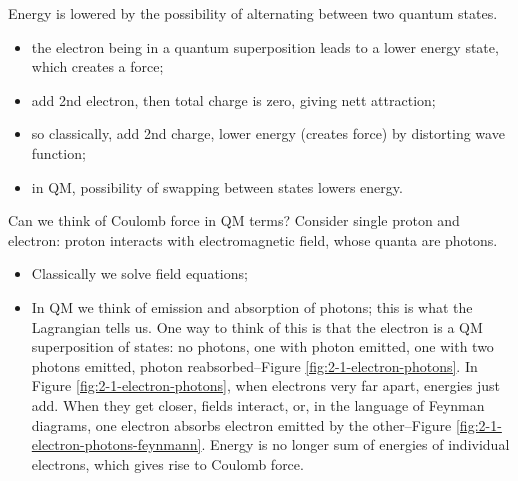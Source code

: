\documentclass[]{article}
\begin{document}
Energy is lowered by the possibility of alternating between two quantum states.

\begin{itemize}
	\item the electron being in a quantum superposition leads to a lower energy state, which creates a force;
	
	\item add 2nd electron, then total charge is zero, giving nett attraction; 

	\item so classically, add 2nd charge, lower energy (creates force) by distorting wave function;
	\item in QM, possibility of swapping between states lowers energy.
\end{itemize}
Can we think of Coulomb force in QM terms? Consider single proton and electron: proton interacts with electromagnetic field, whose quanta are photons.

\begin{itemize}
	\item Classically we solve field equations;
	\item In QM we think of emission and absorption of photons; this is what the Lagrangian tells us. One way to think of this is that the electron is a QM superposition of states: no photons, one with photon emitted,  one with two photons emitted, photon reabsorbed--Figure \ref{fig:2-1-electron-photons}. In Figure \ref{fig:2-1-electron-photons}, when electrons very far apart, energies just add. When they get closer, fields interact, or, in the language of Feynman diagrams, one electron absorbs electron emitted by the other--Figure \ref{fig:2-1-electron-photons-feynmann}.  Energy is no longer sum of energies of individual electrons, which gives rise to Coulomb force.
\end{itemize}
\end{document}
